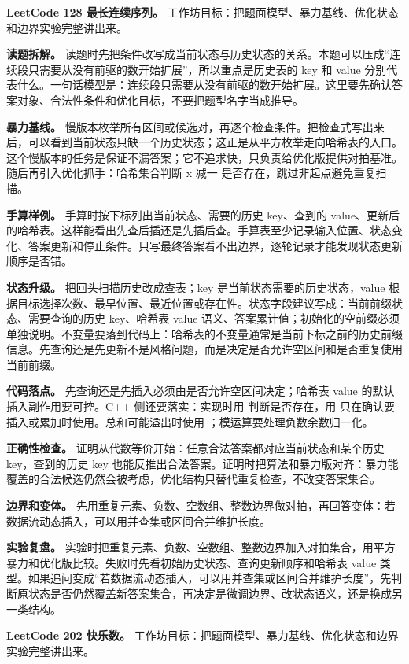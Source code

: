 \noindent\textbf{LeetCode 128 最长连续序列。} 工作坊目标：把题面模型、暴力基线、优化状态和边界实验完整讲出来。

\textbf{读题拆解。} 读题时先把条件改写成当前状态与历史状态的关系。本题可以压成“连续段只需要从没有前驱的数开始扩展”，所以重点是历史表的 key 和 value 分别代表什么。一句话模型是：连续段只需要从没有前驱的数开始扩展。这里要先确认答案对象、合法性条件和优化目标，不要把题型名字当成推导。

\textbf{暴力基线。} 慢版本枚举所有区间或候选对，再逐个检查条件。把检查式写出来后，可以看到当前状态只缺一个历史状态；这正是从平方枚举走向哈希表的入口。这个慢版本的任务是保证不漏答案；它不追求快，只负责给优化版提供对拍基准。随后再引入优化抓手：哈希集合判断 x 减一 是否存在，跳过非起点避免重复扫描。

\textbf{手算样例。} 手算时按下标列出当前状态、需要的历史 key、查到的 value、更新后的哈希表。这样能看出先查后插还是先插后查。手算表至少记录输入位置、状态变化、答案更新和停止条件。只写最终答案看不出边界，逐轮记录才能发现状态更新顺序是否错。

\textbf{状态升级。} 把回头扫描历史改成查表；key 是当前状态需要的历史状态，value 根据目标选择次数、最早位置、最近位置或存在性。状态字段建议写成：当前前缀状态、需要查询的历史 key、哈希表 value 语义、答案累计值；初始化的空前缀必须单独说明。不变量要落到代码上：哈希表的不变量通常是当前下标之前的历史前缀信息。先查询还是先更新不是风格问题，而是决定是否允许空区间和是否重复使用当前前缀。

\textbf{代码落点。} 先查询还是先插入必须由是否允许空区间决定；哈希表 value 的默认插入副作用要可控。C++ 侧还要落实：实现时用  判断是否存在，用  只在确认要插入或累加时使用。总和可能溢出时使用 ；模运算要处理负数余数归一化。

\textbf{正确性检查。} 证明从代数等价开始：任意合法答案都对应当前状态和某个历史 key，查到的历史 key 也能反推出合法答案。证明时把算法和暴力版对齐：暴力能覆盖的合法候选仍然会被考虑，优化结构只替代重复检查，不改变答案集合。

\textbf{边界和变体。} 先用重复元素、负数、空数组、整数边界做对拍，再回答变体：若数据流动态插入，可以用并查集或区间合并维护长度。

\textbf{实验复盘。} 实验时把重复元素、负数、空数组、整数边界加入对拍集合，用平方暴力和优化版比较。失败时先看初始历史状态、查询更新顺序和哈希表 value 类型。如果追问变成“若数据流动态插入，可以用并查集或区间合并维护长度”，先判断原状态是否仍然覆盖新答案集合，再决定是微调边界、改状态语义，还是换成另一类结构。

\noindent\textbf{LeetCode 202 快乐数。} 工作坊目标：把题面模型、暴力基线、优化状态和边界实验完整讲出来。


